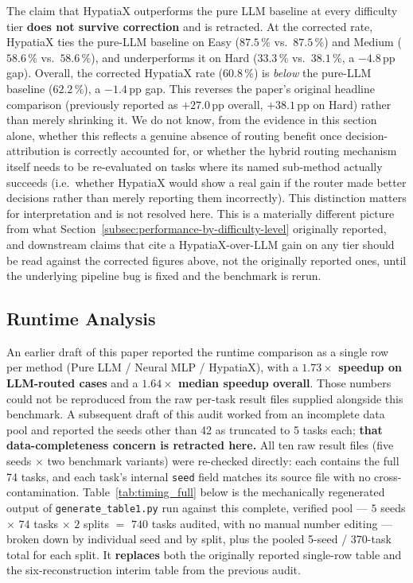 \documentclass[twoside,11pt]{article}
\begin{document}
The claim that HypatiaX outperforms the pure LLM baseline at every
difficulty tier \textbf{does not survive correction} and is retracted. At
the corrected rate, HypatiaX ties the pure-LLM baseline on Easy ($87.5\,\%$
vs.\ $87.5\,\%$) and Medium ($58.6\,\%$ vs.\ $58.6\,\%$), and underperforms
it on Hard ($33.3\,\%$ vs.\ $38.1\,\%$, a $-4.8$\,pp gap). Overall, the
corrected HypatiaX rate ($60.8\,\%$) is \emph{below} the pure-LLM baseline
($62.2\,\%$), a $-1.4$\,pp gap. This reverses the paper's original headline
comparison (previously reported as $+27.0$\,pp overall, $+38.1$\,pp on
Hard) rather than merely shrinking it. We do not know, from the evidence in
this section alone, whether this reflects a genuine absence of routing
benefit once decision-attribution is correctly accounted for, or whether
the hybrid routing mechanism itself needs to be re-evaluated on tasks where
its named sub-method actually succeeds (i.e.\ whether HypatiaX would show a
real gain if the router made better decisions rather than merely reporting
them incorrectly). This distinction matters for interpretation and is not
resolved here. This is a materially different picture from
what Section~\ref{subsec:performance-by-difficulty-level} originally
reported, and downstream claims that cite a HypatiaX-over-LLM gain on any
tier should be read against the corrected figures above, not the
originally reported ones, until the underlying pipeline bug is fixed and
the benchmark is rerun.

\subsection{Runtime Analysis}\label{subsec:runtime-analysis}
\label{sec:timing}

An earlier draft of this paper reported the runtime comparison as a single
row per method (Pure LLM / Neural MLP / HypatiaX), with a
\textbf{$1.73\times$ speedup on LLM-routed cases} and a
\textbf{$1.64\times$ median speedup overall}. Those numbers could not be
reproduced from the raw per-task result files supplied alongside this
benchmark. A subsequent draft of this audit worked from an incomplete
data pool and reported the seeds other than 42 as truncated to 5 tasks
each; \textbf{that data-completeness concern is retracted here.} All ten
raw result files (five seeds $\times$ two benchmark variants) were
re-checked directly: each contains the full 74 tasks, and each task's
internal \texttt{seed} field matches its source file with no
cross-contamination. Table~\ref{tab:timing_full} below is the mechanically
regenerated output of \texttt{generate\_table1.py} run against this
complete, verified pool --- $5$ seeds $\times$ $74$ tasks $\times$ $2$
splits $=$ $740$ tasks audited, with no manual number editing --- broken
down by individual seed and by split, plus the pooled 5-seed / 370-task
total for each split. It \textbf{replaces} both the originally reported
single-row table and the six-reconstruction interim table from the
previous audit.
\end{document}
